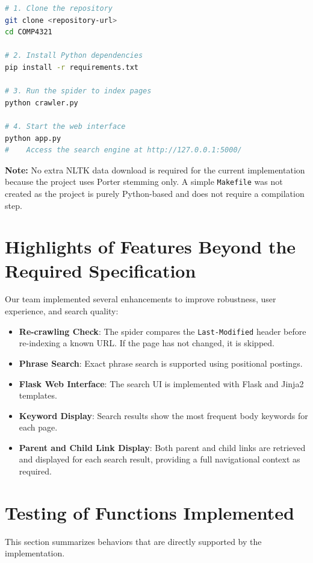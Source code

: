 \documentclass[11pt,a4paper]{article}
\begin{document}
\begin{lstlisting}[language=bash, caption=Installation and Execution Commands]
# 1. Clone the repository
git clone <repository-url>
cd COMP4321

# 2. Install Python dependencies
pip install -r requirements.txt

# 3. Run the spider to index pages
python crawler.py

# 4. Start the web interface
python app.py
#    Access the search engine at http://127.0.0.1:5000/
\end{lstlisting}
\textbf{Note:} No extra NLTK data download is required for the current implementation because the project uses Porter stemming only. A simple \texttt{Makefile} was not created as the project is purely Python-based and does not require a compilation step.

\section{Highlights of Features Beyond the Required Specification}
Our team implemented several enhancements to improve robustness, user experience, and search quality:
\begin{itemize}
    \item \textbf{Re-crawling Check}: The spider compares the \texttt{Last-Modified} header before re-indexing a known URL. If the page has not changed, it is skipped.
    \item \textbf{Phrase Search}: Exact phrase search is supported using positional postings.
    \item \textbf{Flask Web Interface}: The search UI is implemented with Flask and Jinja2 templates.
    \item \textbf{Keyword Display}: Search results show the most frequent body keywords for each page.
    \item \textbf{Parent and Child Link Display}: Both parent and child links are retrieved and displayed for each search result, providing a full navigational context as required.
\end{itemize}

\section{Testing of Functions Implemented}
This section summarizes behaviors that are directly supported by the implementation.
\end{document}
